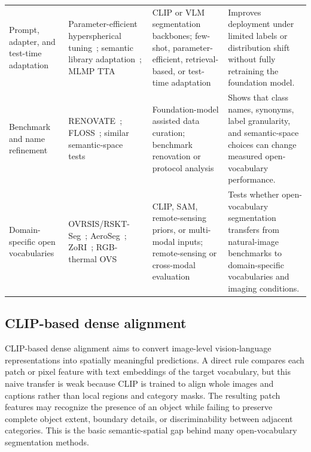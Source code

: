 \begin{table}[t]
\begin{tabularx}{\textwidth}{>{\raggedright\arraybackslash}p{}>{\raggedright\arraybackslash}X>{\raggedright\arraybackslash}p{}>{\raggedright\arraybackslash}p{}}
Prompt, adapter, and test-time adaptation & Parameter-efficient hyperspherical tuning~\citep{zpengParameterefficientFinetuningHyperspherical2025}; semantic library adaptation~\citep{rqorbaniSemanticLibraryAdaptation2025}; MLMP TTA~\citep{noorimTesttimeAdaptationVisionlanguage2026} & CLIP or VLM segmentation backbones; few-shot, parameter-efficient, retrieval-based, or test-time adaptation & Improves deployment under limited labels or distribution shift without fully retraining the foundation model. \\
Benchmark and name refinement & RENOVATE~\citep{hhuangRenovatingNamesOpenvocabulary2024}; FLOSS~\citep{ybenigmimFlossFreeLunch2025}; similar semantic-space tests~\citep{yliuSteppingOutSimilar2025} & Foundation-model assisted data curation; benchmark renovation or protocol analysis & Shows that class names, synonyms, label granularity, and semantic-space choices can change measured open-vocabulary performance. \\
Domain-specific open vocabularies & OVRSIS/RSKT-Seg~\citep{libExploringEfficientOpenvocabulary2026}; AeroSeg~\citep{sduttaAerosegHarnessingSam2025}; ZoRI~\citep{huangZoRIDiscriminativeZeroshot2025}; RGB-thermal OVS~\citep{zhaoOpenvocabularyRGBThermalSemantic2024} & CLIP, SAM, remote-sensing priors, or multi-modal inputs; remote-sensing or cross-modal evaluation & Tests whether open-vocabulary segmentation transfers from natural-image benchmarks to domain-specific vocabularies and imaging conditions. \\
\bottomrule
\end{tabularx}
\end{table}

\subsection{CLIP-based dense alignment}

CLIP-based dense alignment aims to convert image-level vision-language representations into spatially meaningful predictions. A direct rule compares each patch or pixel feature with text embeddings of the target vocabulary, but this naive transfer is weak because CLIP is trained to align whole images and captions rather than local regions and category masks. The resulting patch features may recognize the presence of an object while failing to preserve complete object extent, boundary details, or discriminability between adjacent categories. This is the basic semantic-spatial gap behind many open-vocabulary segmentation methods.

